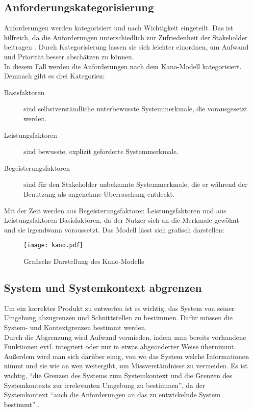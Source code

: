 \documentclass [12pt, a4paper, oneside, titlepage, ngerman]{article}
\begin{document}
\subsection{Anforderungskategorisierung}
Anforderungen werden kategorisiert und nach Wichtigkeit eingeteilt. Das ist hilfreich, da die Anforderungen unterschiedlich zur Zufriedenheit der Stakeholder beitragen\cite[vgl. S.24]{PohlRupp2015} . Durch Kategorisierung lassen sie sich leichter einordnen, um Aufwand und Priorität besser abschätzen zu können. \\
In diesem Fall werden die Anforderungen nach dem Kano-Modell kategorisiert. Demnach gibt es drei Kategorien\cite[vgl. S.24]{PohlRupp2015}:
\begin{description} 
\item[Basisfaktoren] sind selbstverständliche unterbewusste Systemmerkmale, die vorausgesetzt werden. 
\item[Leistungsfaktoren] sind bewusste, explizit geforderte Systemmerkmale.
\item[Begeisterungsfaktoren] sind für den Stakeholder unbekannte Systemmerkmale, die er während der Benutzung als angenehme Überraschung entdeckt.
\end{description}
Mit der Zeit werden aus Begeisterungsfaktoren Leistungsfaktoren und aus Leistungsfaktoren Basisfaktoren, da der Nutzer sich an die Merkmale gewöhnt und sie irgendwann voraussetzt. Das Modell lässt sich grafisch darstellen: 

\begin{figure}[H]
	\centering
	\texttt{[image: kano.pdf]}
	\caption{Grafische Darstellung des Kano-Modells}
	\label{img:kano}
\end{figure}





\subsection{System und Systemkontext abgrenzen}
Um ein korrektes Produkt zu entwerfen ist es wichtig, das System von seiner Umgebung abzugrenzen und Schnittstellen zu bestimmen. Dafür müssen die System- und Kontextgrenzen bestimmt werden. \\
Durch die Abgrenzung wird Aufwand vermieden, indem man bereits vorhandene Funktionen evtl. integriert oder nur in etwas abgeänderter Weise übernimmt. Außerdem wird man sich darüber einig, von wo das System welche Informationen nimmt und sie wie an wen weitergibt, um Missverständnisse zu vermeiden. Es ist wichtig, "`die Grenzen des Systems zum Systemkontext und die Grenzen des Systemkontexts zur irrelevanten Umgebung zu bestimmen"'\cite[S.20]{PohlRupp2015}, da der Systemkontext "`auch die Anforderungen an das zu entwickelnde System bestimmt"' \cite[S.20]{PohlRupp2015}.
\end{document}
